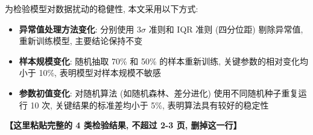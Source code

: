 为检验模型对数据扰动的稳健性, 本文采用以下方式:
\begin{itemize}
  \item \textbf{异常值处理方法变化}: 分别使用 3$\sigma$ 准则和 IQR 准则 (四分位距) 剔除异常值, 重新训练模型, 主要结论保持不变
  \item \textbf{样本规模变化}: 随机抽取 70\% 和 50\% 的样本重新训练, 关键参数的相对变化均小于 10\%, 表明模型对样本规模不敏感
  \item \textbf{参数初值变化}: 对随机算法 (如随机森林、差分进化) 使用不同随机种子重复运行 10 次, 关键结果的标准差均小于 5\%, 表明算法具有较好的稳定性
\end{itemize}

\textbf{【这里粘贴完整的 4 类检验结果, 不超过 2-3 页, 删掉这一行】}
